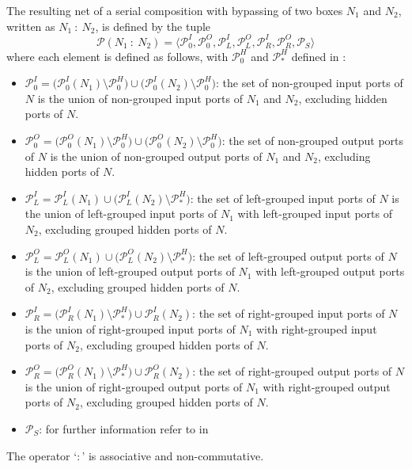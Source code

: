 \begin{definition}
    \label{def_smx_so}
    The resulting net of a serial composition with bypassing of two boxes $N_1$ and $N_2$, written as $N_1\ :\ N_2$, is defined by the tuple
    $$\mathcal{P}(N_1\ :\ N_2) = \langle \mathcal{P}_0^I, \mathcal{P}_0^O, \mathcal{P}_L^I, \mathcal{P}_L^O, \mathcal{P}_R^I, \mathcal{P}_R^O, \mathcal{P}_S \rangle$$
    where each element is defined as follows, with $\mathcal{P}_0^H$ and $\mathcal{P}_*^H$ defined in \Def{\ref{def_smx_sc}}:
    \begin{itemize}
        \item $\mathcal{P}_0^I = \big ( \mathcal{P}_0^I(N_1) \setminus \mathcal{P}_0^H \big ) \cup \big ( \mathcal{P}_0^I(N_2) \setminus \mathcal{P}_0^H \big )$:
            the set of non-grouped input ports of $N$ is the union of non-grouped input ports of $N_1$ and $N_2$, excluding hidden ports of $N$.
        \item $\mathcal{P}_0^O = \big ( \mathcal{P}_0^O(N_1) \setminus \mathcal{P}_0^H \big ) \cup \big ( \mathcal{P}_0^O(N_2) \setminus \mathcal{P}_0^H \big )$:
            the set of non-grouped output ports of $N$ is the union of non-grouped output ports of $N_1$ and $N_2$, excluding hidden ports of $N$.
        \item $\mathcal{P}_L^I = \mathcal{P}_L^I(N_1) \cup \big ( \mathcal{P}_L^I(N_2) \setminus \mathcal{P}_*^H \big )$:
            the set of left-grouped input ports of $N$ is the union of left-grouped input ports of $N_1$ with left-grouped input ports of $N_2$, excluding grouped hidden ports of $N$.
        \item $\mathcal{P}_L^O = \mathcal{P}_L^O(N_1) \cup \big ( \mathcal{P}_L^O(N_2) \setminus \mathcal{P}_*^H \big )$:
            the set of left-grouped output ports of $N$ is the union of left-grouped output ports of $N_1$ with left-grouped output ports of $N_2$, excluding grouped hidden ports of $N$.
        \item $\mathcal{P}_R^I = \big ( \mathcal{P}_R^I(N_1) \setminus \mathcal{P}_*^H \big ) \cup \mathcal{P}_R^I(N_2)$:
            the set of right-grouped input ports of $N$ is the union of right-grouped input ports of $N_1$ with right-grouped input ports of $N_2$, excluding grouped hidden ports of $N$.
        \item $\mathcal{P}_R^O = \big ( \mathcal{P}_R^O(N_1) \setminus \mathcal{P}_*^H \big ) \cup \mathcal{P}_R^O(N_2)$:
            the set of right-grouped output ports of $N$ is the union of right-grouped output ports of $N_1$ with right-grouped output ports of $N_2$, excluding grouped hidden ports of $N$.
        \item $\mathcal{P}_S$:
            for further information refer to \Def{\ref{def_smx_side}} in \Sect{\ref{sect_smx_nets_side}}
    \end{itemize}
    The operator `$:$' is associative and non-commutative.
\end{definition}

